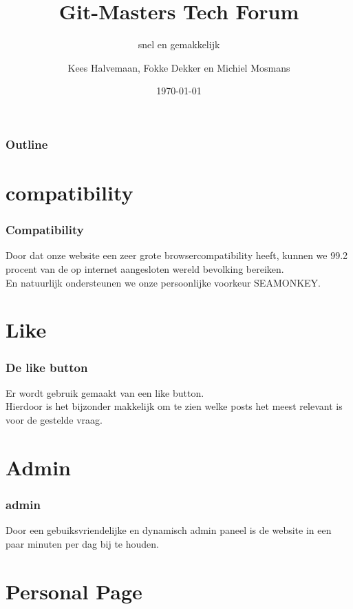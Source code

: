 \documentclass{beamer}
\title{Git-Masters Tech Forum}
\subtitle{snel en gemakkelijk}
\author{Kees Halvemaan, Fokke Dekker en Michiel Mosmans}
\institute
{
Project webprogrammeren en databases \\
 Faculteit der Natuurwetenschappen, Wiskunde en Informatica \\
 Universiteit van Amsterdam\\
}
\date{\today}
\begin{document}
\begin{frame}
  \titlepage
\end{frame}

\begin{frame}
\frametitle{Outline}
\tableofcontents
\end{frame}


\section{compatibility}

\begin{frame}
\frametitle{Compatibility}
Door dat onze website een zeer grote browsercompatibility heeft, kunnen we 99.2 procent van de op internet aangesloten wereld bevolking bereiken. \\ En natuurlijk ondersteunen we onze persoonlijke voorkeur SEAMONKEY.


\end{frame}

 \section{Like}

 \begin{frame}
\frametitle{De like button}

Er wordt gebruik gemaakt van een like button. \\ Hierdoor is het bijzonder makkelijk om te zien welke posts het meest relevant is voor de gestelde vraag.

\end{frame}

\section{Admin}

\begin{frame}
\frametitle{admin}

Door een gebuiksvriendelijke en dynamisch admin paneel is de website in een paar minuten per dag bij te houden.
\end{frame}

\section{Personal Page}
\end{document}
